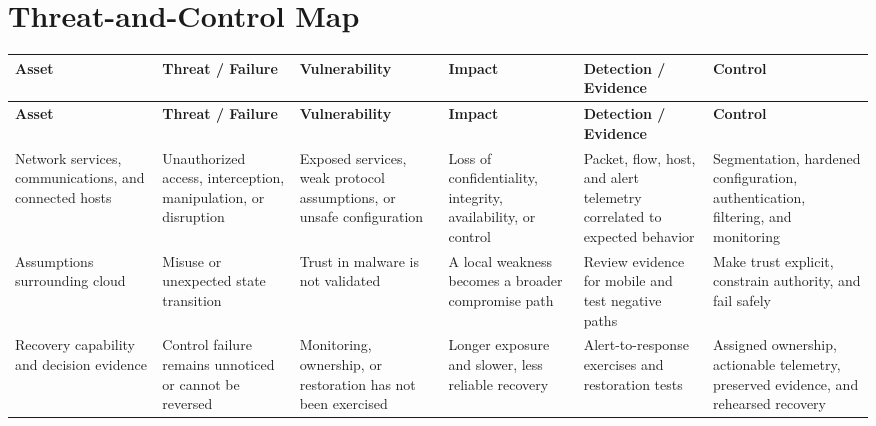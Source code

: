 \documentclass[11pt]{article}
\begin{document}
\section*{Threat-and-Control Map}
\begingroup\scriptsize\setlength{\tabcolsep}{2pt}
\begin{longtable}{>{\RaggedRight\arraybackslash}p{}>{\RaggedRight\arraybackslash}p{}>{\RaggedRight\arraybackslash}p{}>{\RaggedRight\arraybackslash}p{}>{\RaggedRight\arraybackslash}p{}>{\RaggedRight\arraybackslash}p{}}
\toprule\rowcolor{Navy}\color{white}\textbf{Asset} & \color{white}\textbf{Threat / Failure} & \color{white}\textbf{Vulnerability} & \color{white}\textbf{Impact} & \color{white}\textbf{Detection / Evidence} & \color{white}\textbf{Control}\\\midrule
\endfirsthead
\toprule\rowcolor{Navy}\color{white}\textbf{Asset} & \color{white}\textbf{Threat / Failure} & \color{white}\textbf{Vulnerability} & \color{white}\textbf{Impact} & \color{white}\textbf{Detection / Evidence} & \color{white}\textbf{Control}\\\midrule
\endhead
Network services, communications, and connected hosts & Unauthorized access, interception, manipulation, or disruption & Exposed services, weak protocol assumptions, or unsafe configuration & Loss of confidentiality, integrity, availability, or control & Packet, flow, host, and alert telemetry correlated to expected behavior & Segmentation, hardened configuration, authentication, filtering, and monitoring\\\midrule
Assumptions surrounding cloud & Misuse or unexpected state transition & Trust in malware is not validated & A local weakness becomes a broader compromise path & Review evidence for mobile and test negative paths & Make trust explicit, constrain authority, and fail safely\\\midrule
Recovery capability and decision evidence & Control failure remains unnoticed or cannot be reversed & Monitoring, ownership, or restoration has not been exercised & Longer exposure and slower, less reliable recovery & Alert-to-response exercises and restoration tests & Assigned ownership, actionable telemetry, preserved evidence, and rehearsed recovery\\\midrule
\bottomrule
\end{longtable}
\endgroup
\end{document}

